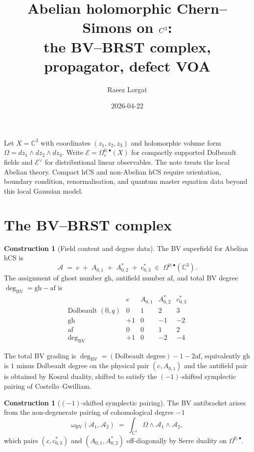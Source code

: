 \documentclass[11pt]{amsart}
\title{Abelian holomorphic Chern--Simons on $\C^3$:\\
the BV--BRST complex, propagator, defect VOA}
\author{Raeez Lorgat}
\date{2026-04-22}
\providecommand{\C}{\mathbb{C}}
\providecommand{\gh}{\mathrm{gh}}
\providecommand{\af}{\mathrm{af}}
\theoremstyle{plain}
\theoremstyle{definition}
\newtheorem{construction}[theorem]{Construction}
\theoremstyle{remark}
\begin{document}
\maketitle

Let $X = \C^3$ with coordinates $(z_1, z_2, z_3)$ and holomorphic volume
form $\Omega = dz_1 \wedge dz_2 \wedge dz_3$. Write
$\mathcal{E} = \Omega^{0,\bullet}_c(X)$ for compactly supported
Dolbeault fields and $\mathcal{E}^{\vee}$ for distributional linear
observables. The note treats the local Abelian theory. Compact hCS and
non-Abelian hCS require orientation, boundary condition, renormalisation,
and quantum master equation data beyond this local Gaussian model.

\section{The BV--BRST complex}

\begin{construction}[Field content and degree data]
\label{cons:bv-field}
The BV superfield for Abelian hCS is
\[
\mathcal{A} \;=\; c \;+\; A_{0,1} \;+\; A^{\ast}_{0,2} \;+\; c^{\ast}_{0,3}
\;\in\; \Omega^{0,\bullet}(\C^3).
\]
The assignment of ghost number $\gh$, antifield number $\af$, and total BV
degree $\deg_{\mathrm{BV}} = \gh - \af$ is
\[
\begin{array}{c|cccc}
 & c & A_{0,1} & A^{\ast}_{0,2} & c^{\ast}_{0,3} \\ \hline
\text{Dolbeault } (0,q) & 0 & 1 & 2 & 3 \\
\gh & +1 & 0 & -1 & -2 \\
\af & 0 & 0 & 1 & 2 \\
\deg_{\mathrm{BV}} & +1 & 0 & -2 & -4
\end{array}
\]
\end{construction}

The total BV grading is $\deg_{\mathrm{BV}} = (\text{Dolbeault degree}) - 1 - 2\af$,
equivalently $\gh$ is $1$ minus Dolbeault degree on the physical
pair $(c, A_{0,1})$ and the antifield pair is obtained by Koszul duality,
shifted to satisfy the $(-1)$-shifted symplectic pairing of
Costello--Gwilliam.

\begin{construction}[$(-1)$-shifted symplectic pairing]
\label{cons:bv-pairing}
The BV antibracket arises from the non-degenerate pairing of cohomological
degree $-1$
\[
\omega_{\mathrm{BV}}(\mathcal{A}_1, \mathcal{A}_2) \;=\;
\int_{\C^3} \Omega \wedge \mathcal{A}_1 \wedge \mathcal{A}_2,
\]
which pairs $(c, c^{\ast}_{0,3})$ and $(A_{0,1}, A^{\ast}_{0,2})$ off-diagonally
by Serre duality on $\Omega^{0,\bullet}$.
\end{construction}
\end{document}

